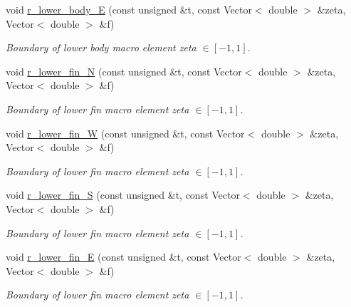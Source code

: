 \begin{DoxyCompactItemize}
void \hyperlink{classoomph_1_1FishDomain_abb85a2acd9cf3cd8fae60fd9e487bd1c}{r\+\_\+lower\+\_\+body\+\_\+E} (const unsigned \&t, const Vector$<$ double $>$ \&zeta, Vector$<$ double $>$ \&f)
\begin{DoxyCompactList}\small\item\em Boundary of lower body macro element zeta $ \in [-1,1] $. \end{DoxyCompactList}\item 
void \hyperlink{classoomph_1_1FishDomain_a6d45dba13043b2b6df831848da665f21}{r\+\_\+lower\+\_\+fin\+\_\+N} (const unsigned \&t, const Vector$<$ double $>$ \&zeta, Vector$<$ double $>$ \&f)
\begin{DoxyCompactList}\small\item\em Boundary of lower fin macro element zeta $ \in [-1,1] $. \end{DoxyCompactList}\item 
void \hyperlink{classoomph_1_1FishDomain_aaf5f3eb1842dc9d7e3f51d4b727632f9}{r\+\_\+lower\+\_\+fin\+\_\+W} (const unsigned \&t, const Vector$<$ double $>$ \&zeta, Vector$<$ double $>$ \&f)
\begin{DoxyCompactList}\small\item\em Boundary of lower fin macro element zeta $ \in [-1,1] $. \end{DoxyCompactList}\item 
void \hyperlink{classoomph_1_1FishDomain_a2110fb0b776654460d6a3477fbc4979d}{r\+\_\+lower\+\_\+fin\+\_\+S} (const unsigned \&t, const Vector$<$ double $>$ \&zeta, Vector$<$ double $>$ \&f)
\begin{DoxyCompactList}\small\item\em Boundary of lower fin macro element zeta $ \in [-1,1] $. \end{DoxyCompactList}\item 
void \hyperlink{classoomph_1_1FishDomain_a956dcbb87e9b37a0b965fcddb9911de3}{r\+\_\+lower\+\_\+fin\+\_\+E} (const unsigned \&t, const Vector$<$ double $>$ \&zeta, Vector$<$ double $>$ \&f)
\begin{DoxyCompactList}\small\item\em Boundary of lower fin macro element zeta $ \in [-1,1] $. \end{DoxyCompactList}\end{DoxyCompactItemize}
